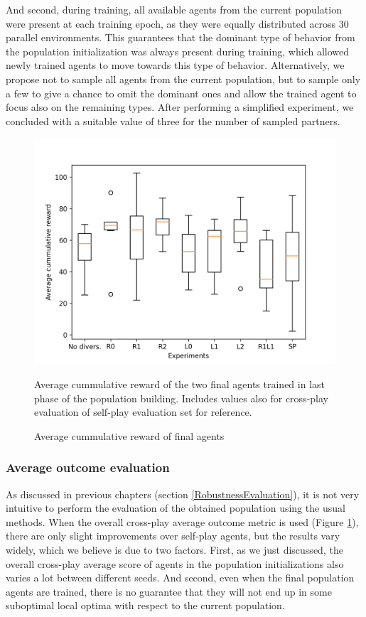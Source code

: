 And second, during training, all available agents from the current population were present at each training epoch, as they were equally distributed across 30 parallel environments.
This guarantees that the dominant type of behavior from the population initialization was always present during training, which allowed newly trained agents to move towards this type of behavior.
Alternatively, we propose not to sample all agents from the current population, but to sample only a few to give a chance to omit the dominant ones and allow the trained agent to focus also on the remaining types.
After performing a simplified experiment, we concluded with a suitable value of three for the number of sampled partners. 


\begin{figure}[!ht]
    \centering
    \includegraphics*[width=14cm]{../img/SimpleCnnExperimentsAvg.png}

    \caption{Average cummulative reward of final agents}
    \label{AvgCummulativeRewardEvaluated}
    \medskip
    \small 
    Average cummulative reward of the two final agents trained in last phase of the population building.
    Includes values also for cross-play evaluation of self-play evaluation set for reference. 

\end{figure}

\subsubsection{Average outcome evaluation}

As discussed in previous chapters (section \ref{RobustnessEvaluation}), it is not very intuitive to perform the evaluation of the obtained population using the usual methods. 
When the overall cross-play average outcome metric is used (Figure \ref{AvgCummulativeRewardEvaluated}), there are only slight improvements over self-play agents, but the results vary widely, which we believe is due to two factors.
First, as we just discussed, the overall cross-play average score of agents in the population initializations also varies a lot between different seeds.
And second, even when the final population agents are trained, there is no guarantee that they will not end up in some suboptimal local optima with respect to the current population.


